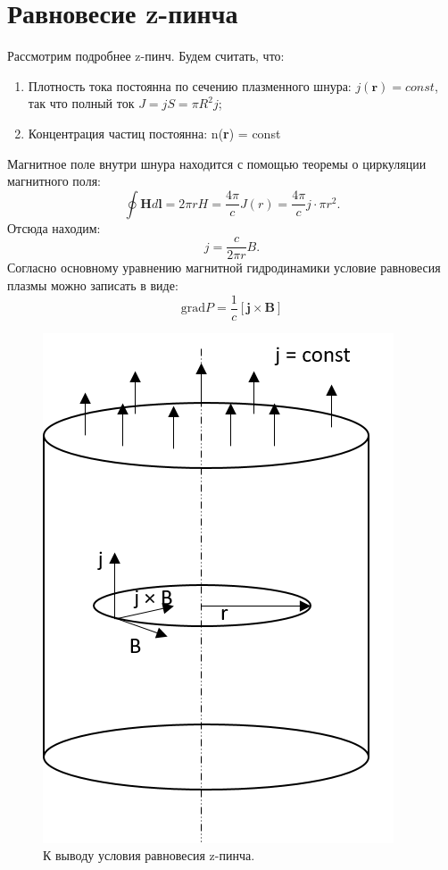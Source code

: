 \documentclass[12pt]{kiarticle} %
\begin{document}
	\section{Равновесие z-пинча}
	Рассмотрим подробнее z-пинч. Будем считать, что:
	\begin{enumerate}
		\item Плотность тока постоянна по сечению плазменного шнура: $j(\textbf{r}) = const$, так что полный ток $J = jS = \pi R^2 j$;
		\item Концентрация частиц постоянна: n(\textbf{r}) = const
	\end{enumerate}
	Магнитное поле внутри шнура находится с помощью теоремы о циркуляции магнитного поля:
	\[ \oint {\textbf{H} d\textbf{l}} = 2 \pi r H = \dfrac{4\pi}{c} J(r) = \dfrac{4\pi}{c}j \cdot \pi r^2.  \]
	Отсюда находим:
	\[ j = \dfrac{c}{2 \pi r}B.  \]
	Согласно основному уравнению магнитной гидродинамики условие равновесия плазмы можно записать в виде:
	\[ \mathrm{grad} P = \dfrac{1}{c}[\textbf{j} \times \textbf{B}]  \]
	\begin{figure} 
	
		\includegraphics[width=\linewidth]{Pic3.png}
		\caption{К выводу условия равновесия z-пинча.}
		\label{Pic3}
	\end{figure}
\end{document}
